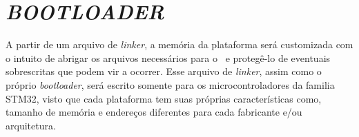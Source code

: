 





\section{\textit{BOOTLOADER}}
\label{sec:Bootloader}

A partir de um arquivo de \textit{linker}, a memória da plataforma será customizada com o intuito de abrigar os arquivos necessários para o \bootloader\ e protegê-lo de eventuais sobrescritas que podem vir a ocorrer. Esse arquivo de \textit{linker}, assim como o próprio \textit{bootloader}, será escrito somente para os microcontroladores da familia STM32, visto que cada plataforma tem suas próprias características como, tamanho de memória e endereços diferentes para cada fabricante e/ou arquitetura.

